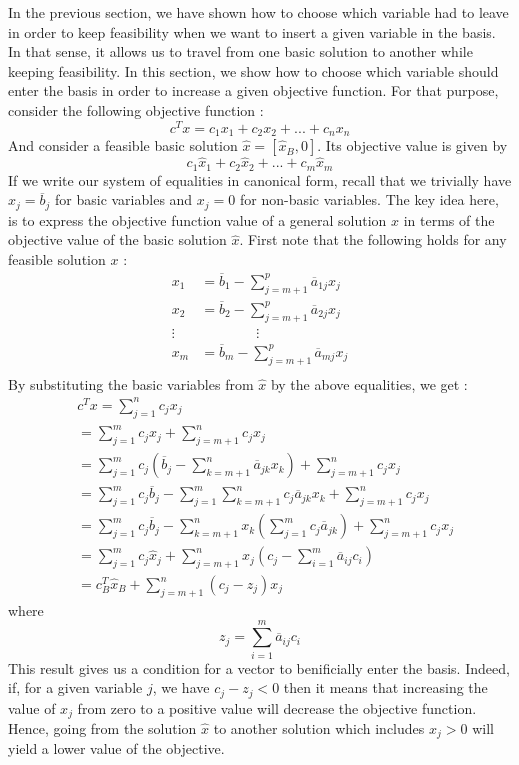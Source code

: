 In the previous section, we have shown how to choose which variable had to leave in order to keep feasibility when we want to insert a given variable in the basis. In that sense, it allows us to travel from one basic solution to another while keeping feasibility. In this section, we show how to choose which variable should enter the basis in order to increase a given objective function. For that purpose, consider the following objective function : \[ c^Tx = c_1x_1 + c_2x_2 + ... + c_nx_n \] And consider a feasible basic solution $\hat x = [\hat x_B, 0]$. Its objective value is given by \[ c_1\hat x_1 + c_2\hat x_2 + ... + c_m\hat x_m \] If we write our system of equalities in canonical form, recall that we trivially have $x_j = \overline b_j$ for basic variables and $x_j = 0$ for non-basic variables. The key idea here, is to express the objective function value of a general solution $x$ in terms of the objective value of the basic solution $\hat x$. First note that the following holds for any feasible solution $x$ :
\begin{align*}
    x_1 &= \overline b_1 - \sum_{j=m+1}^p \overline a_{1j}x_j \\
    x_2 &= \overline b_2 - \sum_{j=m+1}^p \overline a_{2j}x_j \\
    \vdots & \qquad\qquad \vdots \\
    x_m &= \overline b_m - \sum_{j=m+1}^p \overline a_{mj}x_j \\
\end{align*} By substituting the basic variables from $\hat x$ by the above equalities, we get :
\begin{align*}
    &c^Tx = \sum_{j=1}^n c_jx_j\\
    &= \sum_{j=1}^m c_jx_j + \sum_{j=m+1}^n c_jx_j\\
    &= \sum_{j=1}^m c_j\left( \overline b_j - \sum_{k=m+1}^n \overline a_{jk}x_k \right) + \sum_{j=m+1}^n c_jx_j\\
    &= \sum_{j=1}^m c_j\overline b_j - \sum_{j=1}^m \sum_{k=m+1}^n c_j\overline a_{jk}x_k + \sum_{j=m+1}^n c_jx_j\\
    &= \sum_{j=1}^m c_j\overline b_j - \sum_{k=m+1}^nx_k\left(\sum_{j=1}^m c_j\overline a_{jk}\right) + \sum_{j=m+1}^n c_jx_j\\
    &= \sum_{j=1}^m c_j\hat{x}_j + \sum_{j=m+1}^n x_j\left( c_j - \sum_{i=1}^m \overline a_{ij}c_i \right)\\
    &= c^T_B\hat x_B + \sum_{j=m+1}^n (c_j - z_j)x_j
\end{align*}
where \[ z_j = \sum_{i=1}^m \overline a_{ij}c_i \] This result gives us a condition for a vector to benificially enter the basis. Indeed, if, for a given variable $j$, we have $c_j - z_j < 0$ then it means that increasing the value of $x_j$ from zero to a positive value will decrease the objective function. Hence, going from the solution $\hat x$ to another solution which includes $x_j > 0$ will yield a lower value of the objective. 

